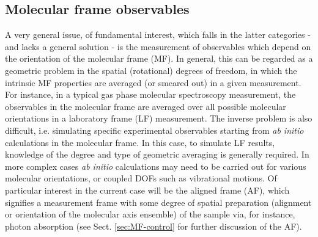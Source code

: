 \documentclass[10pt]{article}
\begin{document}
\subsection{Molecular frame observables\label{sec:MF-intro}}

A very general issue, of fundamental interest, which falls in the latter categories - and lacks a general solution - is the measurement of observables which depend on the orientation of the molecular frame (MF). In general, this can be regarded as a geometric problem in the spatial (rotational) degrees of freedom, in which the intrinsic MF properties are averaged (or smeared out) in a given measurement. For instance, in a typical gas phase molecular spectroscopy measurement, the observables in the molecular frame  are averaged over all possible molecular orientations in a laboratory frame (LF) measurement. The inverse problem is also difficult, i.e. simulating specific experimental observables starting from \textit{ab initio} calculations in the molecular frame. In this case, to simulate LF results, knowledge of the degree and type of geometric averaging is generally required. In more complex cases \textit{ab initio} calculations may need to be carried out for various molecular orientations, or coupled DOFs such as vibrational motions. Of particular interest in the current case will be the aligned frame (AF), which signifies a measurement frame with some degree of spatial preparation (alignment or orientation of the molecular axis ensemble) of the sample via, for instance, photon absorption (see Sect. \ref{sec:MF-control} for further discussion of the AF).
\end{document}
